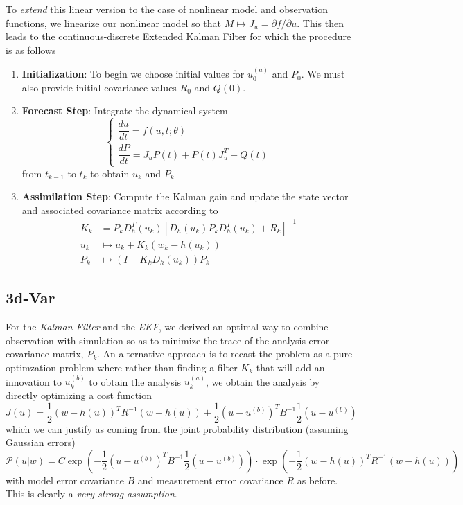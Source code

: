 To \textit{extend} this linear version to the case of nonlinear model and observation functions, we linearize our nonlinear model so that $M\mapsto J_{u}=\partial f/\partial u$. This then leads to the continuous-discrete Extended Kalman Filter for which the procedure is as follows
\begin{enumerate}
\item \textbf{Initialization}: To begin we choose initial values for $u_0^{(a)}$ and $P_0$. We must also provide initial covariance values $R_0$ and $Q(0)$.
\item \textbf{Forecast Step}: Integrate the dynamical system
  \begin{equation}
    \begin{cases}
      \dfrac{du}{dt} = f(u,t;\theta) \\
      \dfrac{dP}{dt} = J_{u}P(t) + P(t)J_{u}^T + Q(t)
    \end{cases}
  \end{equation}
  from $t_{k-1}$ to $t_{k}$ to obtain $u_{k}$ and $P_{k}$
\item \textbf{Assimilation Step}: Compute the Kalman gain and update the state vector and associated covariance matrix according to
  \begin{align}
    K_k &= P_kD_{h}^T(u_k)\left[ D_h(u_k)P_kD_h^T(u_k) + R_k \right]^{-1} \\
    u_k &\mapsto u_k + K_k(w_k - h(u_k)) \\
    P_k &\mapsto (I - K_kD_h(u_k))P_k
  \end{align}
\end{enumerate}




\subsection{3d-Var}

For the \textit{Kalman Filter} and the \textit{EKF}, we derived an optimal way to combine observation with simulation so as to minimize the trace of the analysis error covariance matrix, $P_k$. An alternative approach is to recast the problem as a pure optimzation problem where rather than finding a filter $K_k$ that will add an innovation to $u_k^{(b)}$ to obtain the analysis $u_k^{(a)}$, we obtain the analysis by directly optimizing a cost function
\begin{equation}
J(u) = \frac{1}{2}\left(w - h(u) \right)^TR^{-1}\left(w - h(u) \right) + \frac{1}{2}\left(u - u^{(b)} \right)^TB^{-1}\frac{1}{2}\left(u - u^{(b)} \right)
\end{equation}
which we can justify as coming from the joint probability distribution (assuming Gaussian errors)
\begin{equation}
\mathcal{P}(u|w) = C\exp\left(- \frac{1}{2}\left(u - u^{(b)} \right)^TB^{-1}\frac{1}{2}\left(u - u^{(b)} \right) \right)\cdot\exp\left(-  \frac{1}{2}\left(w - h(u) \right)^TR^{-1}\left(w - h(u) \right) \right)
\end{equation}
with model error covariance $B$ and measurement error covariance $R$ as before. This is clearly a \textit{very strong assumption}.


